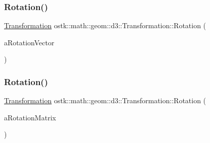 \subsubsection{\texorpdfstring{Rotation()}{Rotation()}\hspace{0.1cm}{\footnotesize\ttfamily [1/2]}}
{\footnotesize\ttfamily \hyperlink{classostk_1_1math_1_1geom_1_1d3_1_1_transformation}{Transformation} ostk\+::math\+::geom\+::d3\+::\+Transformation\+::\+Rotation (\begin{DoxyParamCaption}\item[{const \hyperlink{classostk_1_1math_1_1geom_1_1d3_1_1trf_1_1rot_1_1_rotation_vector}{Rotation\+Vector} \&}]{a\+Rotation\+Vector }\end{DoxyParamCaption})\hspace{0.3cm}{\ttfamily [static]}}

\mbox{\label{classostk_1_1math_1_1geom_1_1d3_1_1_transformation_a9513e711eed54a55f45e1c7d5e8e73b8}} 
\subsubsection{\texorpdfstring{Rotation()}{Rotation()}\hspace{0.1cm}{\footnotesize\ttfamily [2/2]}}
{\footnotesize\ttfamily \hyperlink{classostk_1_1math_1_1geom_1_1d3_1_1_transformation}{Transformation} ostk\+::math\+::geom\+::d3\+::\+Transformation\+::\+Rotation (\begin{DoxyParamCaption}\item[{const \hyperlink{classostk_1_1math_1_1geom_1_1d3_1_1trf_1_1rot_1_1_rotation_matrix}{Rotation\+Matrix} \&}]{a\+Rotation\+Matrix }\end{DoxyParamCaption})\hspace{0.3cm}{\ttfamily [static]}}

\mbox{\label{classostk_1_1math_1_1geom_1_1d3_1_1_transformation_ad9a9f56f5d20f5b789fef9a320e229a4}} 
